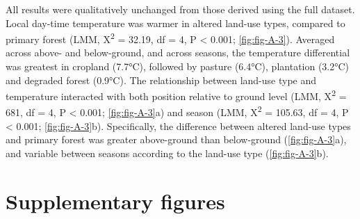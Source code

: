 \documentclass[12pt,a4paper,]{report}
\theoremstyle{definition}
\theoremstyle{definition}
\theoremstyle{definition}
\theoremstyle{remark}
\begin{document}
All results were qualitatively unchanged from those derived using the
full dataset. Local day-time temperature was warmer in altered land-use
types, compared to primary forest (LMM, Χ\textsuperscript{2} = 32.19, df
= 4, P \textless{} 0.001; \autoref{fig:fig-A-3}). Averaged across above-
and below-ground, and across seasons, the temperature differential was
greatest in cropland (7.7°C), followed by pasture (6.4°C), plantation
(3.2°C) and degraded forest (0.9°C). The relationship between land-use
type and temperature interacted with both position relative to ground
level (LMM, Χ\textsuperscript{2} = 681, df = 4, P \textless{} 0.001;
\autoref{fig:fig-A-3}a) and season (LMM, Χ\textsuperscript{2} = 105.63,
df = 4, P \textless{} 0.001; \autoref{fig:fig-A-3}b). Specifically, the
difference between altered land-use types and primary forest was greater
above-ground than below-ground (\autoref{fig:fig-A-3}a), and variable
between seasons according to the land-use type (\autoref{fig:fig-A-3}b).

\pagebreak

\section{Supplementary figures}\label{supplementary-figures}
\end{document}
